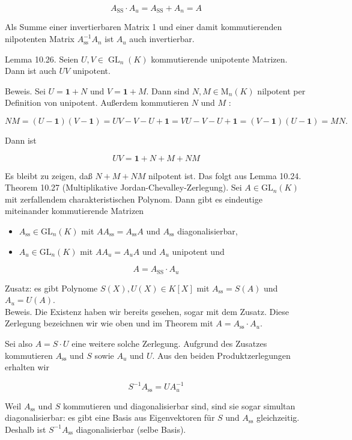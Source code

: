 \documentclass[10pt, letterpaper]{article}
\begin{document}
$$
A_{\mathrm{SS}} \cdot A_{u}=A_{\mathrm{SS}}+A_{n}=A
$$

Als Summe einer invertierbaren Matrix 1 und einer damit kommutierenden nilpotenten Matrix $A_{\mathrm{ss}}^{-1} A_{n}$ ist $A_{u}$ auch invertierbar.

Lemma 10.26. Seien $U, V \in \operatorname{GL}_{n}(K)$ kommutierende unipotente Matrizen. Dann ist auch $U V$ unipotent.

Beweis. Sei $U=\mathbf{1}+N$ und $V=\mathbf{1}+M$. Dann sind $N, M \in \mathrm{M}_{n}(K)$ nilpotent per Definition von unipotent. Außerdem kommutieren $N$ und $M$ :

$$
N M=(U-\mathbf{1})(V-\mathbf{1})=U V-V-U+\mathbf{1}=V U-V-U+\mathbf{1}=(V-\mathbf{1})(U-\mathbf{1})=M N .
$$

Dann ist

$$
U V=\mathbf{1}+N+M+N M
$$

Es bleibt zu zeigen, daß $N+M+N M$ nilpotent ist. Das folgt aus Lemma 10.24.\\
Theorem 10.27 (Multiplikative Jordan-Chevalley-Zerlegung). Sei $A \in \mathrm{GL}_{n}(K)$ mit zerfallendem charakteristischen Polynom. Dann gibt es eindeutige miteinander kommutierende Matrizen

\begin{itemize}
  \item $A_{\mathrm{ss}} \in \mathrm{GL}_{n}(K)$ mit $A A_{\mathrm{ss}}=A_{\mathrm{ss}} A$ und $A_{\mathrm{ss}}$ diagonalisierbar,
  \item $A_{u} \in \mathrm{GL}_{n}(K)$ mit $A A_{u}=A_{u} A$ und $A_{u}$ unipotent und
\end{itemize}

$$
A=A_{\mathrm{SS}} \cdot A_{u}
$$

Zusatz: es gibt Polynome $S(X), U(X) \in K[X]$ mit $A_{\mathrm{ss}}=S(A)$ und $A_{u}=U(A)$.\\
Beweis. Die Existenz haben wir bereits gesehen, sogar mit dem Zusatz. Diese Zerlegung bezeichnen wir wie oben und im Theorem mit $A=A_{\mathrm{ss}} \cdot A_{u}$.

Sei also $A=S \cdot U$ eine weitere solche Zerlegung. Aufgrund des Zusatzes kommutieren $A_{\mathrm{ss}}$ und $S$ sowie $A_{u}$ und $U$. Aus den beiden Produktzerlegungen erhalten wir

$$
S^{-1} A_{\mathrm{ss}}=U A_{u}^{-1}
$$

Weil $A_{\mathrm{ss}}$ und $S$ kommutieren und diagonalisierbar sind, sind sie sogar simultan diagonalisierbar: es gibt eine Basis aus Eigenvektoren für $S$ und $A_{\mathrm{ss}}$ gleichzeitig. Deshalb ist $S^{-1} A_{\mathrm{ss}}$ diagonalisierbar (selbe Basis).
\end{document}
